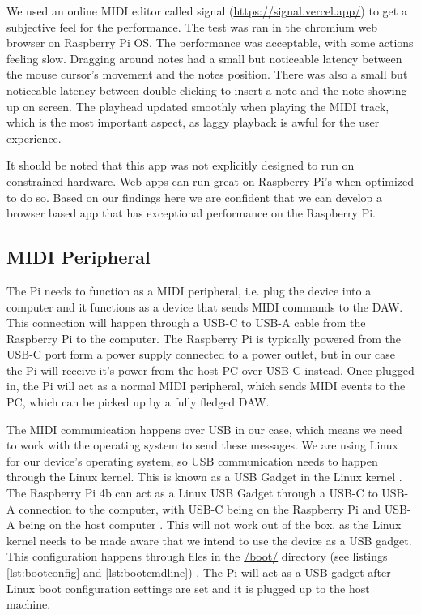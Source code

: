 We used an online MIDI editor called signal (\url{https://signal.vercel.app/}) to get a
subjective feel for the performance. The test was ran in the chromium web browser on
Raspberry Pi OS. The performance was acceptable, with some actions feeling slow.
Dragging around notes had a small but noticeable latency between the mouse cursor's
movement and the notes position. There was also a small but noticeable latency between
double clicking to insert a note and the note showing up on screen. The playhead updated
smoothly when playing the MIDI track, which is the most important aspect, as laggy
playback is awful for the user experience.

It should be noted that this app was not explicitly designed to run on constrained
hardware. Web apps can run great on Raspberry Pi's when optimized to do so. Based on our
findings here we are confident that we can develop a browser based app that has
exceptional performance on the Raspberry Pi.

\subsection{MIDI Peripheral}

The Pi needs to function as a MIDI peripheral, i.e. plug the device into a computer and it
functions as a device that sends MIDI commands to the DAW. This connection will happen
through a USB-C to USB-A cable from the Raspberry Pi to the computer. The Raspberry Pi is
typically powered from the USB-C port form a power supply connected to a power outlet, but
in our case the Pi will receive it's power from the host PC over USB-C instead. Once
plugged in, the Pi will act as a normal MIDI peripheral, which sends MIDI events to the
PC, which can be picked up by a fully fledged DAW.

The MIDI communication happens over USB in our case, which means we need to work with the
operating system to send these messages. We are using Linux for our device's operating
system, so USB communication needs to happen through the Linux kernel. This is known as a
USB Gadget in the Linux kernel \autocite{usbGadgetDocumentation}. The Raspberry Pi 4b can
act as a Linux USB Gadget through a USB-C to USB-A connection to the computer, with USB-C
being on the Raspberry Pi and USB-A being on the host computer
\autocite{raspberryPiGadgetSetup}. This will not work out of the box, as the Linux kernel
needs to be made aware that we intend to use the device as a USB gadget. This
configuration happens through files in the \url{/boot/} directory
(see listings \ref{lst:bootconfig} and
\ref{lst:bootcmdline}) \autocite{raspberryPiGadgetSetup}. The Pi will act as a USB
gadget after Linux boot configuration settings are set and it is plugged up to the host
machine.

